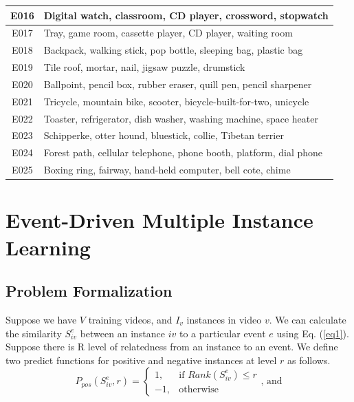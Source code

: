 \begin{table}
\begin{tabular}{|c|l|}
		E016              & Digital watch, classroom, CD player, crossword, stopwatch                           \\ \hline
		E017              & Tray, game room, cassette player, CD player, waiting room                           \\ \hline
		E018              & Backpack, walking stick, pop bottle, sleeping bag, plastic bag                      \\ \hline
		E019              & Tile roof, mortar, nail, jigsaw puzzle, drumstick                                   \\ \hline
		E020              & Ballpoint, pencil box, rubber eraser, quill pen, pencil sharpener                   \\ \hline
		E021              & Tricycle, mountain bike, scooter, bicycle-built-for-two, unicycle                   \\ \hline
		E022              & Toaster, refrigerator, dish washer, washing machine, space heater                   \\ \hline
		E023              & Schipperke, otter hound, bluestick, collie, Tibetan terrier                         \\ \hline
		E024              & Forest path, cellular telephone, phone booth, platform, dial phone                  \\ \hline
		E025              & Boxing ring, fairway, hand-held computer, bell cote, chime                          \\ \hline
	\end{tabular}
		\label{table1}
\end{table}

\section{Event-Driven Multiple Instance Learning}
\subsection{Problem Formalization} Suppose we have $V$ training videos, and $I_{v}$ instances in video $v$. We can calculate the similarity $S_{iv}^{e}$ between an instance $iv$ to a particular event $e$ using Eq. (\ref{eq1}). Suppose there is R level of relatedness from an instance to an event. We define two predict functions for positive and negative instances at level $r$ as follows.
\begin{equation}
\label{eq2}
P_{pos}(S_{iv}^{e},r) = 
\begin{cases}
1,& \text{if } Rank(S_{iv}^{e}) \leq r \\
-1,              & \text{otherwise}
\end{cases}\text{, and}
\end{equation}

